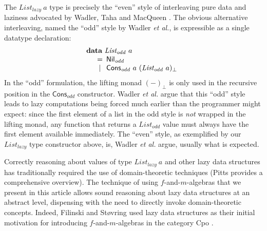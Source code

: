 \documentclass{jfp1}
\newcommand{\kw}[1]{\textbf{#1}}
\begin{document}
The $\mathit{List}_{\mathit{lazy}}~a$ type is precisely the ``even''
style of interleaving pure data and laziness advocated by Wadler, Taha
and MacQueen \cite{wadler89laziness}. The obvious alternative
interleaving, named the ``odd'' style by Wadler \emph{et al.}, is
expressible as a single datatype declaration:
\begin{displaymath}
  \begin{array}{l}
    \kw{data}~\mathit{List_{odd}}~a \\
    \quad
    \begin{array}[t]{c@{\hspace{0.5em}}l}
      = & \mathsf{Nil}_{\mathit{odd}} \\
      | & \mathsf{Cons}_{\mathit{odd}}~a~(\mathit{List_{odd}}~a)_\bot
    \end{array}
  \end{array}
\end{displaymath}
In the ``odd'' formulation, the lifting monad $(-)_\bot$ is only used
in the recursive position in the $\mathsf{Cons}_{\mathit{odd}}$
constructor. Wadler \emph{et al.} argue that this ``odd'' style leads
to lazy computations being forced much earlier than the programmer
might expect: since the first element of a list in the odd style is
\emph{not} wrapped in the lifting monad, any function that returns a
$\mathit{List_{odd}}$ value must always have the first element
available immediately. The ``even'' style, as exemplified by our
$\mathit{List}_{\mathit{lazy}}$ type constructor above, is, Wadler
\emph{et al.} argue, usually what is expected.

Correctly reasoning about values of type $\mathit{List_{lazy}}~a$ and
other lazy data structures has traditionally required the use of
domain-theoretic techniques (Pitts \cite{pitts96relational} provides a
comprehensive overview). The technique of using $f$-and-$m$-algebras
that we present in this article allows sound reasoning about lazy data
structures at an abstract level, dispensing with the need to directly
invoke domain-theoretic concepts. Indeed, Filinski and St\o{}vring
used lazy data structures as their initial motivation for introducing
$f$-and-$m$-algebras in the category Cpo \cite{filinski07inductive}.
\end{document}
